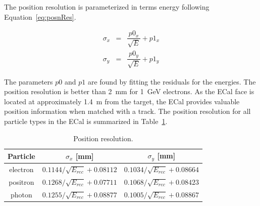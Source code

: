 The position resolution is parameterized in terms energy following Equation~\eqref{eq:posnRes}.
 
\begin{eqnarray*}
\label{eq:posnRes}
\sigma_x & = & \dfrac{p0_x}{\sqrt{E}}+p1_x\\
\sigma_y & = & \dfrac{p0_y}{\sqrt{E}}+p1_y
\end{eqnarray*}

The parameters $p0$ and $p1$ are found by fitting the residuals for the energies. The position resolution is better than 2~mm for 1~GeV electrons. As the ECal face is located at  approximately 1.4~m from the target, the ECal provides valuable position information when matched with a track. The position resolution for all particle types in the ECal is summarized in Table~\ref{tab:PosnResTable}. 

\begin{table}[H]
\caption{Position resolution.}
\label{tab:PosnResTable}
\centering
\begin{tabular}{|c|c|c|}
\toprule
Particle & $\sigma_x$ [mm] & $\sigma_y$ [mm] \\
\midrule
electron & $0.1144/\sqrt{E_{rec}}+0.08112$ & $0.1034/\sqrt{E_{rec}}+0.08664$ \\
positron & $0.1268/\sqrt{E_{rec}}+0.07711$ & $0.1068/\sqrt{E_{rec}}+0.08423$ \\
photon & $0.1255/\sqrt{E_{rec}}+0.08877$ & $0.1005/\sqrt{E_{rec}}+0.08867$ \\
\bottomrule
\end{tabular}
\end{table}